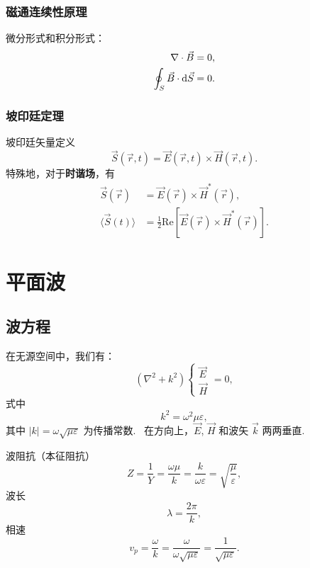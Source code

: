 \documentclass[Chinese, use boldface, twocolumn]{lebhart}
\numberwithin{equation}{section}
\begin{document}
\subsubsection{磁通连续性原理}
微分形式和积分形式：
\begin{subequations}
  \begin{align}
    \nabla\cdot\vec{B}&=0,\\
    \oint_S\vec{B}\cdot\odif{\vec{S}}&=0.
  \end{align}
\end{subequations}

\subsubsection{坡印廷定理}

坡印廷矢量定义
\begin{equation}
  \vec{S}(\vec{r},t)=\vec{E}(\vec{r},t)\times\vec{H}(\vec{r},t).
\end{equation}
特殊地，对于\textbf{时谐场}，有
\begin{align}
  \vec{S}(\vec{r})&=\vec{E}(\vec{r})\times\vec{H}^*(\vec{r}),\\
  \langle\vec{S}(t)\rangle&=\frac12\mathrm{Re}\left[\vec{E}(\vec{r})\times\vec{H}^*(\vec{r})\right].
\end{align}

\section{平面波}

\subsection{波方程}

在无源空间中，我们有：
\begin{equation}
  (\nabla^2+k^2)\left\{\begin{aligned}
    \vec{E}\\\vec{H}
  \end{aligned}\right.=0,
\end{equation}
式中
\begin{equation}
  k^2=\omega^2\mu\varepsilon,
\end{equation}
其中 $|k|=\omega\sqrt{\mu\varepsilon}$ 为传播常数.\ %
在方向上，$\vec{E}$, $\vec{H}$ 和波矢 $\vec{k}$ 两两垂直.

波阻抗（本征阻抗）
\begin{equation}
  Z=\frac1Y=\frac{\omega\mu}{k}=\frac{k}{\omega\varepsilon}=\sqrt{\frac{\mu}{\varepsilon}},
\end{equation}
波长
\begin{equation}
  \lambda=\frac{2\pi}{k},
\end{equation}
相速
\begin{equation}
  v_p=\frac{\omega}{k}=\frac{\omega}{\omega\sqrt{\mu\varepsilon}}=\frac1{\sqrt{\mu\varepsilon}}.
\end{equation}
\end{document}
